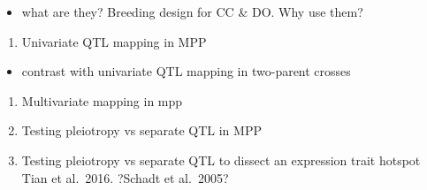 \documentclass[]{article}
\providecommand{\tightlist}{%
  \setlength{\itemsep}{0pt}\setlength{\parskip}{0pt}}
\begin{document}
\begin{itemize}
\tightlist
\item
  what are they? Breeding design for CC \& DO. Why use them?
\end{itemize}

\begin{enumerate}
\def\labelenumi{\arabic{enumi}.}
\setcounter{enumi}{4}
\tightlist
\item
  Univariate QTL mapping in MPP
\end{enumerate}

\begin{itemize}
\tightlist
\item
  contrast with univariate QTL mapping in two-parent crosses
\end{itemize}

\begin{enumerate}
\def\labelenumi{\arabic{enumi}.}
\setcounter{enumi}{5}
\item
  Multivariate mapping in mpp
\item
  Testing pleiotropy vs separate QTL in MPP
\item
  Testing pleiotropy vs separate QTL to dissect an expression trait
  hotspot Tian et al.~2016. ?Schadt et al.~2005?
\end{enumerate}
\end{document}
